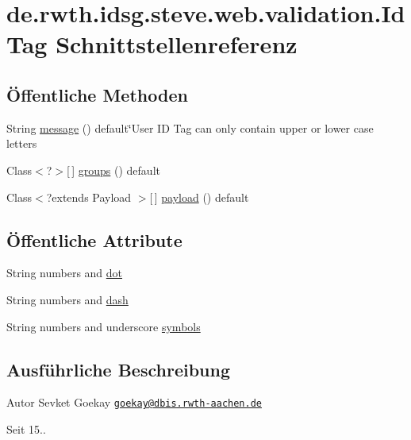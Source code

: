 \hypertarget{interfacede_1_1rwth_1_1idsg_1_1steve_1_1web_1_1validation_1_1_id_tag}{\section{de.\-rwth.\-idsg.\-steve.\-web.\-validation.\-Id\-Tag Schnittstellenreferenz}
\label{interfacede_1_1rwth_1_1idsg_1_1steve_1_1web_1_1validation_1_1_id_tag}
}
\subsection*{Öffentliche Methoden}
\begin{DoxyCompactItemize}
\item 
String \hyperlink{interfacede_1_1rwth_1_1idsg_1_1steve_1_1web_1_1validation_1_1_id_tag_a299dcaace4082645da6c514f7df6dddd}{message} () default\char`\"{}User I\-D Tag can only contain upper or lower case letters
\item 
Class$<$?$>$\mbox{[}$\,$\mbox{]} \hyperlink{interfacede_1_1rwth_1_1idsg_1_1steve_1_1web_1_1validation_1_1_id_tag_acddbe2b26350553ce8d363581e686557}{groups} () default
\item 
Class$<$?extends Payload $>$\mbox{[}$\,$\mbox{]} \hyperlink{interfacede_1_1rwth_1_1idsg_1_1steve_1_1web_1_1validation_1_1_id_tag_a56fe755f86ae87347fd5078dd5d18c64}{payload} () default
\end{DoxyCompactItemize}
\subsection*{Öffentliche Attribute}
\begin{DoxyCompactItemize}
\item 
String numbers and \hyperlink{interfacede_1_1rwth_1_1idsg_1_1steve_1_1web_1_1validation_1_1_id_tag_a39834f0933c670923b9547c9606aa61b}{dot}
\item 
String numbers and \hyperlink{interfacede_1_1rwth_1_1idsg_1_1steve_1_1web_1_1validation_1_1_id_tag_aa0d09b323e37c7ef9c04d2ed5f337e8d}{dash}
\item 
String numbers and underscore \hyperlink{interfacede_1_1rwth_1_1idsg_1_1steve_1_1web_1_1validation_1_1_id_tag_a19a9f8538560b959db4b406c1576862e}{symbols}
\end{DoxyCompactItemize}


\subsection{Ausführliche Beschreibung}
\begin{DoxyAuthor}{Autor}
Sevket Goekay \href{mailto:goekay@dbis.rwth-aachen.de}{\tt goekay@dbis.\-rwth-\/aachen.\-de} 
\end{DoxyAuthor}
\begin{DoxySince}{Seit}
15.. 
\end{DoxySince}


